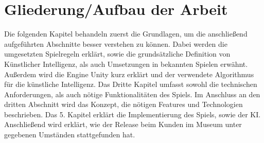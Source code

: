 

\section{Gliederung/Aufbau der Arbeit}
\label{ch:Einleitung:sec:Gliederung}


Die folgenden Kapitel behandeln zuerst die Grundlagen, um die anschließend aufgeführten Abschnitte besser verstehen zu können. Dabei werden die umgesetzten Spielregeln erklärt, sowie die grundsätzliche Definition von Künstlicher Intelligenz, als auch Umsetzungen in bekannten Spielen erwähnt. Außerdem wird die Engine Unity kurz erklärt und der verwendete Algorithmus für die künstliche Intelligenz. Das Dritte Kapitel umfasst sowohl die technischen Anforderungen, als auch nötige Funktionalitäten des Spiels.
Im Anschluss an den dritten Abschnitt wird das Konzept, die nötigen Features und Technologien beschrieben.
Das 5. Kapitel erklärt die Implementierung des Spiels, sowie der KI. Anschließend wird erklärt, wie der Release beim Kunden im Museum unter gegebenen Umständen stattgefunden hat.


